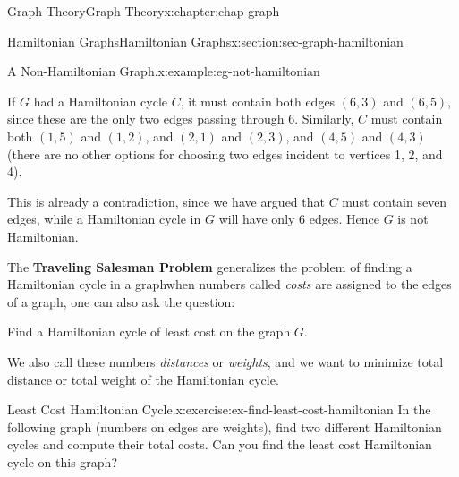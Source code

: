 \documentclass[oneside,10pt,]{book}
\newcommand{\terminology}[1]{\textbf{#1}}
\numberwithin{equation}{section}
\begin{document}
\begin{chapterptx}{Graph Theory}{}{Graph Theory}{}{}{x:chapter:chap-graph}
\begin{sectionptx}{Hamiltonian Graphs}{}{Hamiltonian Graphs}{}{}{x:section:sec-graph-hamiltonian}
\begin{example}{A Non-Hamiltonian Graph.}{x:example:eg-not-hamiltonian}
\begin{sidebyside}{1}{0.375}{0.375}{0}
\begin{sbspanel}{0.25}
{
}%
\end{sbspanel}%
\end{sidebyside}%
\par
If \(G\) had a Hamiltonian cycle \(C\), it must contain both edges \((6,3)\) and \((6,5)\), since these are the only two edges passing through 6. Similarly, \(C\) must contain both \((1,5)\) and \((1,2)\), and \((2,1)\) and \((2,3)\), and \((4,5)\) and \((4,3)\) (there are no other options for choosing two edges incident to vertices 1, 2, and 4).%
\par
This is already a contradiction, since we have argued that \(C\) must contain seven edges, while a Hamiltonian cycle in \(G\) will have only 6 edges. Hence \(G\) is not Hamiltonian.%
\end{example}
The \terminology{Traveling Salesman Problem} generalizes the problem of finding a Hamiltonian cycle in a graph\textemdash{}when numbers called \emph{costs} are assigned to the edges of a graph, one can also ask the question:%
\begin{sidebyside}{1}{0.125}{0.125}{0}%
\begin{sbspanel}{0.75}%
Find a Hamiltonian cycle of least cost on the graph \(G\).%
\end{sbspanel}%
\end{sidebyside}%
\par
We also call these numbers \emph{distances} or \emph{weights}, and we want to minimize total distance or total weight of the Hamiltonian cycle.%
\begin{inlineexercise}{Least Cost Hamiltonian Cycle.}{x:exercise:ex-find-least-cost-hamiltonian}%
In the following graph (numbers on edges are weights), find two different Hamiltonian cycles and compute their total costs. Can you find the least cost Hamiltonian cycle on this graph?%
\begin{sidebyside}{1}{0.35}{0.35}{0}%
\begin{sbspanel}{0.3}%
\resizebox{\linewidth}{!}{%
\begin{tikzpicture}[scale=0.9]

\end{tikzpicture}}
\end{sbspanel}
\end{sidebyside}
\end{inlineexercise}
\end{sectionptx}
\end{chapterptx}
\end{document}
